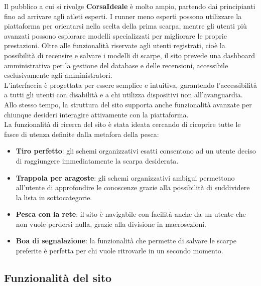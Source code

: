 \documentclass[a4paper, 12pt]{article}
\begin{document}
\begin{justify}
Il pubblico a cui si rivolge \textbf{CorsaIdeale} è molto ampio, partendo dai principianti fino ad arrivare agli atleti esperti. I runner meno esperti possono utilizzare la piattaforma per orientarsi nella scelta della prima scarpa, mentre gli utenti più avanzati possono esplorare modelli specializzati per migliorare le proprie prestazioni. Oltre alle funzionalità riservate agli utenti registrati, cioè la possibilità di recensire e salvare i modelli di scarpe, il sito prevede una dashboard amministrativa per la gestione del database e delle recensioni, accessibile esclusivamente agli amministratori.\\
L'interfaccia è progettata per essere semplice e intuitiva, garantendo l'accessibilità a tutti gli utenti con disabilità e a chi utilizza dispositivi non all'avanguardia. Allo stesso tempo, la struttura del sito supporta anche funzionalità avanzate per chiunque desideri interagire attivamente con la piattaforma.\\
La funzionalità di ricerca del sito è stata ideata cercando di ricoprire tutte le fasce di utenza definite dalla metafora della pesca:
\begin{itemize}
    \item \textbf{Tiro perfetto}: gli schemi organizzativi esatti consentono ad un utente deciso di raggiungere immediatamente la scarpa desiderata.
    \item \textbf{Trappola per aragoste}: gli schemi organizzativi ambigui permettono all'utente di approfondire le conoscenze grazie alla possibilità di suddividere la lista in sottocategorie.
    \item \textbf{Pesca con la rete}: il sito è navigabile con facilità anche da un utente che non vuole perdersi nulla, grazie alla divisione in macrosezioni.
    \item \textbf{Boa di segnalazione}: la funzionalità che permette di salvare le scarpe preferite è perfetta per chi vuole ritrovarle in un secondo momento.
\end{itemize}

\subsection{Funzionalità del sito}


\end{justify}
\end{document}
